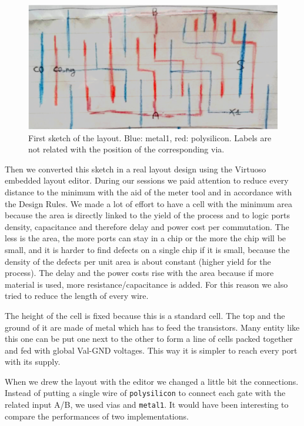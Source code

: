 \documentclass[a4paper]{article}
\begin{document}
\begin{figure}[H]
      \centering
       \includegraphics[width=12cm]{./Images/HA/layout_drw.png}
\caption{First sketch of the layout. Blue: metal1, red: polysilicon. Labels are not related with the position of the corresponding via.}
\label{fig: lay_drw}
\end{figure}

Then we converted this sketch in a real layout design using the Virtuoso embedded layout editor. During our sessions we paid attention to reduce every distance to the minimum with the aid of the meter tool and in accordance with the Design Rules. We made a lot of effort to have a cell with the minimum area because the area is directly linked to the yield of the process and to logic ports density, capacitance and therefore delay and power cost per commutation. The less is the area, the more ports can stay in a chip or the more the chip will be small, and it is harder to find defects on a single chip if it is small, because the density of the defects per unit area is about constant (higher yield for the process). The delay and the power costs rise with the area because if more material is used, more resistance/capacitance is added. For this reason we also tried to reduce the length of every wire.

The height of the cell is fixed because this is a standard cell. The top and the ground of it are made of metal which has to feed the transistors. Many entity like this one can be put one next to the other to form a line of cells packed together and fed with global Val-GND voltages. This way it is simpler to reach every port with its supply.

When we drew the layout with the editor we changed a little bit the connections. Instead of putting a single wire of \texttt{polysilicon} to connect each gate with the related input A/B, we used vias and \texttt{metal1}. It would have been interesting to compare the performances of two implementations.
\end{document}
